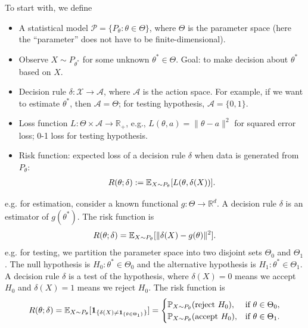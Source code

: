 \documentclass[11pt,letterpaper]{article}
\begin{document}
To start with, we define
\begin{itemize}
  \item A statistical model $\mathcal{P} = \{ P_\theta : \theta \in \Theta \}$, where $\Theta$ is the parameter space (here the ``parameter'' does not have to be finite-dimensional).
  \item Observe $X \sim P_{\theta^*}$ for some unknown $\theta^* \in \Theta$. Goal: to make decision about $\theta^*$ based on $X$.
  \item Decision rule $\delta: \mathcal{X} \rightarrow \mathcal{A}$, where $\mathcal{A}$ is the action space. For example, if we want to estimate $\theta^*$, then $\mathcal{A} = \Theta$; for testing hypothesis, $\mathcal{A} = \{0, 1\}$.
  \item Loss function $L: \Theta \times \mathcal{A} \rightarrow \mathbb{R}_+$, e.g., $L(\theta, a) = \|\theta - a\|^2$ for squared error loss; 0-1 loss for testing hypothesis.
  \item Risk function: expected loss of a decision rule $\delta$ when data is generated from $P_\theta$:
  \begin{align*}
    R (\theta; \delta) := {\mathbb{E}}_{X \sim P_\theta} [L(\theta, \delta(X))].
  \end{align*}
\end{itemize}
e.g. for estimation, consider a known functional $g : \Theta \rightarrow \mathbb{R}^d$. A decision rule $\delta$ is an estimator of $g(\theta^*)$. The risk function is
\begin{align*}
  R (\theta; \delta) = {\mathbb{E}}_{X \sim P_\theta} [\|\delta(X) - g(\theta)\|^2].
\end{align*}
e.g. for testing, we partition the parameter space into two disjoint sets $\Theta_0$ and $\Theta_1$. The null hypothesis is $H_0: \theta^* \in \Theta_0$ and the alternative hypothesis is $H_1: \theta^* \in \Theta_1$. A decision rule $\delta$ is a test of the hypothesis, where $\delta(X) = 0$ means we accept $H_0$ and $\delta(X) = 1$ means we reject $H_0$. The risk function is
\begin{align*}
  R (\theta; \delta) = {\mathbb{E}}_{X \sim P_\theta} [\bm{1}_{\{\delta(X) \neq \bm{1}_{\{\theta \in \Theta_1\}}\}}] = 
  \begin{cases}
    {\mathbb{P}}_{X \sim P_\theta} (\text{reject } H_0), & \text{if } \theta \in \Theta_0,\\
    {\mathbb{P}}_{X \sim P_\theta} (\text{accept } H_0), & \text{if } \theta \in \Theta_1.
  \end{cases}
\end{align*}
\end{document}

